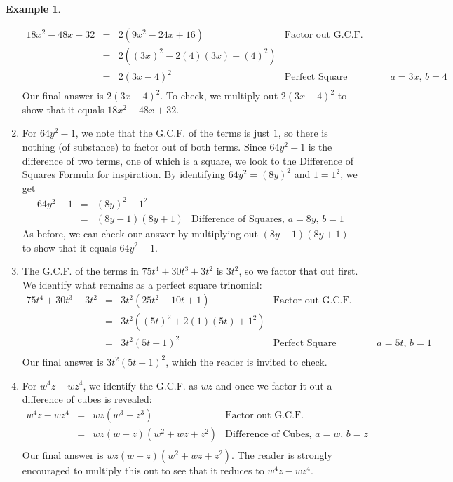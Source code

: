\documentclass[11pt]{article}
\theoremstyle{definition}  %
\newtheorem{ex}{\bf Example}
\begin{document}
\begin{ex}
\begin{enumerate}
\[\begin{array}{rclr}
18x^2 - 48x + 32 & = & 2(9x^2 - 24x + 16) & \text{Factor out G.C.F.}\\
                 & = & 2((3x)^2 - 2(4)(3x) + (4)^2) & \\
								 & = & 2(3x-4)^2 & \text{Perfect Square Trinomial:  $a = 3x$, $b=4$} \\ \end{array}\]Our final answer is $2(3x-4)^2$.  To check, we multiply out $2(3x-4)^2$ to show that it equals $18x^2 - 48x + 32$.
 
\item  For $64y^2 - 1$, we note that the G.C.F. of the terms is just $1$, so there is nothing (of substance) to factor out of both terms. Since $64y^2 - 1$ is the difference of two terms, one of which is a square, we look to the Difference of Squares Formula for inspiration.   By identifying $64y^2 = (8y)^2$ and $1 = 1^2$, we get \[ \begin{array}{rclr} 

64y^2 - 1 & = & (8y)^2 - 1^2 & \\
          & = & (8y-1)(8y+1) & \text{Difference of Squares, $a = 8y$, $b = 1$} \end{array} \] As before, we can check our answer by multiplying out $(8y-1)(8y+1)$ to show that it equals $64y^2 - 1$.

\item  The G.C.F. of the terms in $75t^4 + 30t^3 + 3t^2$ is $3t^2$, so we factor that out first.  We identify what remains as a perfect square trinomial:\[ \begin{array}{rclr}
 
75t^4 + 30t^3 + 3t^2 & = & 3t^2 (25t^2+10t + 1) & \text{Factor out G.C.F.}\\
                     & = & 3t^2 ((5t)^2 + 2(1)(5t) + 1^2) & \\
                     & = & 3t^2 (5t+1)^2 & \text{Perfect Square Trinomial, $a = 5t$, $b = 1$} \\

\end{array}\] Our final answer is $3t^2 (5t+1)^2$, which the reader is invited to check.

\item  For $w^4 z - w z^4$, we identify the G.C.F. as $wz$ and once we factor it out a difference of cubes is revealed: \[ \begin{array}{rclr}

w^4 z - w z^4 & = & wz(w^3 - z^3) & \text{Factor out G.C.F.} \\
              & = & wz(w-z)(w^2+wz+z^2) & \text{Difference of Cubes, $a=w$, $b = z$} \\
							\end{array} \] Our final answer is $wz(w-z)(w^2+wz+z^2)$.  The reader is strongly encouraged to multiply this out to see that it reduces to $w^4 z - w z^4$.


\end{enumerate}
\end{ex}
\end{document}
